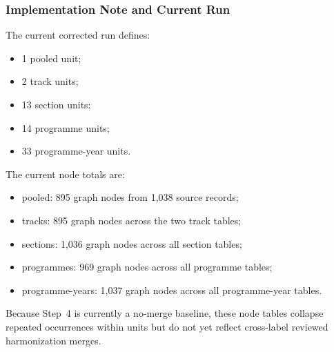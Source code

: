 \subsubsection{Implementation Note and Current Run}
\label{sec:step5_implementation_note}

The current corrected run defines:
\begin{itemize}
    \item 1 pooled unit;
    \item 2 track units;
    \item 13 section units;
    \item 14 programme units;
    \item 33 programme-year units.
\end{itemize}

The current node totals are:
\begin{itemize}
    \item pooled: 895 graph nodes from 1,038 source records;
    \item tracks: 895 graph nodes across the two track tables;
    \item sections: 1,036 graph nodes across all section tables;
    \item programmes: 969 graph nodes across all programme tables;
    \item programme-years: 1,037 graph nodes across all programme-year tables.
\end{itemize}

Because Step~4 is currently a no-merge baseline, these node tables collapse repeated occurrences within units but do not yet reflect cross-label reviewed harmonization merges.
